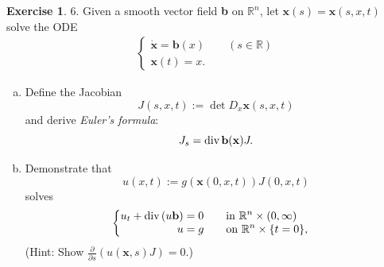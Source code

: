 \documentclass[a4paper]{book}
\numberwithin{equation}{chapter}
\theoremstyle{definition}
\newtheorem{exc}[exm]{Exercise}
\begin{document}
\begin{exc}
  6.  Given a smooth vector field \textbf{b} on $\mathbb{R}^n$, let $\mathbf{x}(s) = \mathbf{x}(s,x,t)$ solve the ODE
  \begin{eqnarray} \nonumber
    \begin{cases}
      \dot{\mathbf{x}} = \mathbf{b}(x) \qquad (s \in \mathbb{R}) \\
      \mathbf{x}(t) = x.
    \end{cases}
  \end{eqnarray}
  \begin{enumerate}[(a)]
  \item Define the Jacobian
    \begin{equation}
      \label{eq:6:5:1}
      J(s,x,t) := \det D_x\mathbf{x}(s,x,t)
    \end{equation}
    and derive \textit{Euler's formula}:
    \begin{equation}
      \label{eq:6:5:2}
      J_s = \textmd{div}\, \mathbf{b(x)}J.
    \end{equation}

  \item Demonstrate that
    \begin{equation}
      \label{eq:6:5:3}
      u(x,t) := g(\mathbf{x}(0,x,t))J(0,x,t)
    \end{equation}
    solves
    \begin{eqnarray}
      \label{eq:6:5:4}
      \begin{cases}
        \begin{aligned}
        u_t + \textmd{div}\,(u\mathbf{b}) &= 0 \qquad \textmd{in } \mathbb{R}^n \times (0,\infty) \\
        u &= g \qquad \textmd{on } \mathbb{R}^n \times \{t = 0\},
        \end{aligned}
      \end{cases}
    \end{eqnarray}
    (Hint: Show $\frac{\partial}{\partial s}(u(\mathbf{x},s)J) = 0$.)
  \end{enumerate}
\end{exc}
\end{document}
